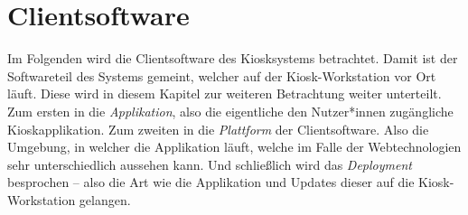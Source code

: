 \section{Clientsoftware}
\label{sec:frontend}

\iffalse
- viele Anforderungen
- Fokus der Thesis
- beschreibt alle Schritte um eine Webandwendung in eine gelunge Kioskapplikation zu bringen
- Was meint Frontend: die eigentliche Kioskapplikation, Plattform: die Umgebung der Applikation, Deployment der Applikation
- SPA Routing im Frontend
- rein mit Webtechnologien, und noch weiter rein mit Browsertechnologien: beschränken auf HTML, CSS und JS
- mit Electron bindet man sich an die Plattform
\fi

Im Folgenden wird die Clientsoftware des Kiosksystems betrachtet. Damit ist der 
Softwareteil des Systems gemeint, welcher auf der Kiosk-Workstation vor 
Ort läuft. Diese wird in diesem Kapitel zur weiteren Betrachtung 
weiter unterteilt. Zum ersten in die \emph{Applikation}, 
also die eigentliche den Nutzer*innen zugängliche Kioskapplikation.
Zum zweiten in die \emph{Plattform} der Clientsoftware.
Also die Umgebung, in welcher die Applikation läuft, welche  
im Falle der Webtechnologien sehr unterschiedlich aussehen kann. 
Und schließlich wird das \emph{Deployment} besprochen -- also die Art wie die Applikation und 
Updates dieser auf die Kiosk-Workstation gelangen.\\




